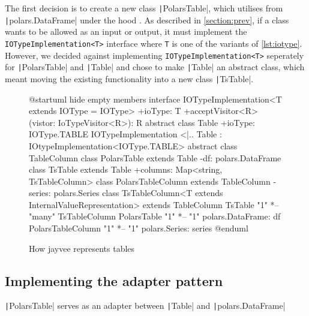 The first decision is to create a new class \texttt|PolarsTable|, which utilises from \texttt|polars.DataFrame| under the hood %
.
As described in \ref{section:prev}, if a class wants to be allowed as an input or output, it must implement the \texttt{IOTypeImplementation<T>} interface where \texttt{T} is one of the variants of \ref{lst:iotype}.
However, we decided against implementing \texttt{IOTypeImplementation<T>} seperately for \texttt|PolarsTable| and \texttt|Table| and chose to make \texttt|Table| an abstract class, which meant moving the existing functionality into a new class \texttt|TsTable|.
\begin{figure}
	\begin{plantuml}
		@startuml
		hide empty members
		interface IOTypeImplementation<T extends IOType = IOType> {
				+ioType: T
				+acceptVisitor<R>(vistor: IoTypeVisitor<R>): R
			}
		abstract class Table {
				+ioType: IOType.TABLE
			}
		IOTypeImplementation <|.. Table : IOtypeImplementation<IOType.TABLE>
		abstract class TableColumn {
			}
		class PolarsTable extends Table {
				-df: polars.DataFrame
			}
		class TsTable extends Table {
				+columns: Map<string, TsTableColumn>
			}
		class PolarsTableColumn extends TableColumn {
				-series: polars.Series
			}
		class TsTableColumn<T extends InternalValueRepresentation> extends TableColumn {
			}
		TsTable "1" *-- "many" TsTableColumn
		PolarsTable "1" *-- "1" polars.DataFrame: df
		PolarsTableColumn "1" *-- "1" polars.Series: series
		@enduml
	\end{plantuml}
	\caption{How jayvee represents tables} %
	\label{fig:current_sit}
\end{figure}


\subsection{Implementing the adapter pattern}
\label{subsection:adapter}

\texttt|PolarsTable| serves as an adapter between \texttt|Table| and \texttt|polars.DataFrame|
